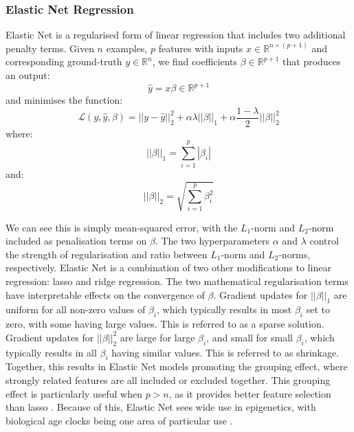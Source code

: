 \documentclass{article}
\begin{document}
\subsubsection{Elastic Net Regression}
Elastic Net \cite{zou2005regularization} is a regularised form of linear regression that includes two additional penalty terms.
Given \(n\) examples, \(p\) features with inputs \(x \in \mathbb{R}^{n \times (p + 1)}\) and corresponding ground-truth \(y \in \mathbb{R}^n\), we find coefficients \(\beta \in \mathbb{R}^{p + 1}\) that produces an output:
\[\hat{y} = x \beta \in \mathbb{R}^{p + 1}\]
and minimises the function:
\[\mathcal{L}(y, \hat{y}, \beta) = ||y - \hat{y}||_2^2 + \alpha\lambda||\beta||_1 + \alpha\frac{1 - \lambda}{2}||\beta||_2^2\]
where:
\[||\beta||_1 = \sum_{i=1}^{p} |\beta_i|\]
and:
\[||\beta||_2 = \sqrt{\sum_{i=1}^{p} \beta_i^2}\]

We can see this is simply mean-squared error, with the \(L_1\)-norm and \(L_2\)-norm included as penalisation terms on \(\beta\). The two hyperparameters \(\alpha\) and \(\lambda\) control the strength of regularisation and ratio between \(L_1\)-norm and \(L_2\)-norms, respectively. Elastic Net is a combination of two other modifications to linear regression: lasso \cite{tibshirani1996regression} and ridge \cite{hoerl1970ridge} regression. The two mathematical regularisation terms have interpretable effects on the convergence of \(\beta\). Gradient updates for \(||\beta||_1\) are uniform for all non-zero values of \(\beta_i\), which typically results in most \(\beta_i\) set to zero, with some having large values. This is referred to as a sparse solution. Gradient updates for \(||\beta||_2^2\) are large for large \(\beta_i\), and small for small \(\beta_i\), which typically results in all \(\beta_i\) having similar values. This is referred to as shrinkage. Together, this results in Elastic Net models promoting the grouping effect, where strongly related features are all included or excluded together. This grouping effect is particularly useful when \(p > n\), as it provides better feature selection than lasso \cite{zou2005regularization}. Because of this, Elastic Net sees wide use in epigenetics, with biological age clocks being one area of particular use \cite{teschendorff2025epigenetic}.
\end{document}
